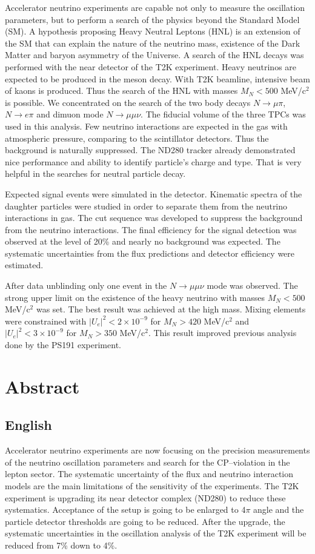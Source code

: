 \documentclass[./main.tex]{subfiles}
\begin{document}
Accelerator neutrino experiments are capable not only to measure the oscillation parameters, but to perform a search of the physics beyond the Standard Model (SM). A hypothesis proposing Heavy Neutral Leptons (HNL) is an extension of the SM that can explain the nature of the neutrino mass, existence of the Dark Matter and baryon asymmetry of the Universe. A search of the HNL decays was performed with the near detector of the T2K experiment. Heavy neutrinos are expected to be produced in the meson decay. With T2K beamline, intensive beam of kaons is produced. Thus the search of the HNL with masses $M_N < 500$ MeV/c${}^2$ is possible. We concentrated on the search of the two body decays $N\to\mu\pi$, $N\to e\pi$ and dimuon mode $N\to\mu\mu\nu$. The fiducial volume of the three TPCs was used in this analysis. Few neutrino interactions are expected in the gas with atmospheric pressure, comparing to the scintillator detectors. Thus the background is naturally suppressed. The ND280 tracker already demonstrated nice performance and ability to identify particle's charge and type. That is very helpful in the searches for neutral particle decay.

Expected signal events were simulated in the detector. Kinematic spectra of the daughter particles were studied in order to separate them from the neutrino interactions in gas. The cut sequence was developed to suppress the background from the neutrino interactions. The final efficiency for the signal detection was observed at the level of 20\% and nearly no background was expected. The systematic uncertainties from the flux predictions and detector efficiency were estimated.

After data unblinding only one event in the $N\to\mu\mu\nu$ mode was observed. The strong upper limit on the existence of the heavy neutrino with masses $M_N < 500$ MeV/c${}^2$ was set. The best result was achieved at the high mass. Mixing elements were constrained with $\left|U_e\right|^2 < 2\times10^{-9}$ for $M_N > 420$ MeV/c${}^2$ and $\left|U_e\right|^2 < 3\times10^{-9}$ for $M_N > 350$ MeV/c${}^2$. This result improved previous analysis done by the PS191 experiment.


\section{Abstract}
\subsection{English}
Accelerator neutrino experiments are now focusing on the precision measurements of the neutrino oscillation parameters and search for the CP--violation in the lepton sector. The systematic uncertainty of the flux and neutrino interaction models are the main limitations of the sensitivity of the experiments. The T2K experiment is upgrading its near detector complex (ND280) to reduce these systematics. Acceptance of the setup is going to be enlarged to 4$\pi$ angle and the particle detector thresholds are going to be reduced. After the upgrade, the systematic uncertainties in the oscillation analysis of the T2K experiment will be reduced from 7\% down to 4\%.
\end{document}
